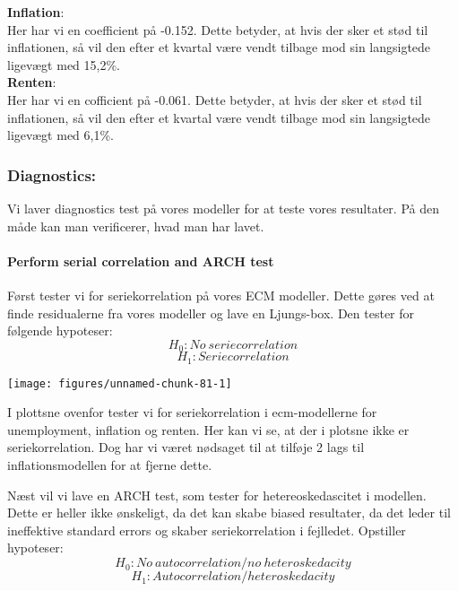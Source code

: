 \documentclass[
  10pt,
]{article}
\begin{document}
\textbf{Inflation}:\\
Her har vi en coefficient på -0.152. Dette betyder, at hvis der sker et
stød til inflationen, så vil den efter et kvartal være vendt tilbage mod
sin langsigtede ligevægt med 15,2\%.\\

\textbf{Renten}:\\
Her har vi en cofficient på -0.061. Dette betyder, at hvis der sker et
stød til inflationen, så vil den efter et kvartal være vendt tilbage mod
sin langsigtede ligevægt med 6,1\%.

\newpage

\hypertarget{diagnostics}{%
\subsubsection{Diagnostics:}\label{diagnostics}}

Vi laver diagnostics test på vores modeller for at teste vores
resultater. På den måde kan man verificerer, hvad man har lavet.

\hypertarget{perform-serial-correlation-and-arch-test}{%
\paragraph{Perform serial correlation and ARCH
test}\label{perform-serial-correlation-and-arch-test}}

\leavevmode

Først tester vi for seriekorrelation på vores ECM modeller. Dette gøres
ved at finde residualerne fra vores modeller og lave en Ljungs-box. Den
tester for følgende hypoteser: \[ H_0 : No\  seriecorrelation\]
\[H_1:Seriecorrelation \]

\begin{center}\texttt{[image: figures/unnamed-chunk-81-1]} \end{center}

I plottsne ovenfor tester vi for seriekorrelation i ecm-modellerne for
unemployment, inflation og renten. Her kan vi se, at der i plotsne ikke
er seriekorrelation. Dog har vi været nødsaget til at tilføje 2 lags til
inflationsmodellen for at fjerne dette.

\newpage

Næst vil vi lave en ARCH test, som tester for hetereoskedascitet i
modellen. Dette er heller ikke ønskeligt, da det kan skabe biased
resultater, da det leder til ineffektive standard errors og skaber
seriekorrelation i fejlledet. Opstiller hypoteser:
\[ H_0 : No \ autocorrelation / no \ heteroskedacity\]
\[ H_1 : Autocorrelation / heteroskedacity\]
\end{document}
